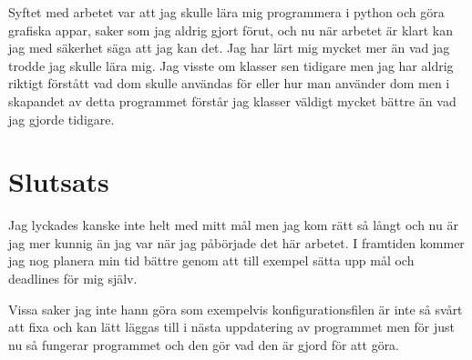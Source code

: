 \documentclass[a4paper, 12pt]{article}
\begin{document}
Syftet med arbetet var att jag skulle lära mig programmera i python och göra grafiska appar, saker som jag aldrig gjort förut, och nu när arbetet är klart kan jag med säkerhet säga att jag kan det. Jag har lärt mig mycket mer än vad jag trodde jag skulle lära mig. Jag visste om klasser sen tidigare men jag har aldrig riktigt förstått vad dom skulle användas för eller hur man använder dom men i skapandet av detta programmet förstår jag klasser väldigt mycket bättre än vad jag gjorde tidigare.


\section{Slutsats}

Jag lyckades kanske inte helt med mitt mål men jag kom rätt så långt och nu är jag mer kunnig än jag var när jag påbörjade det här arbetet.
I framtiden kommer jag nog planera min tid bättre genom att till exempel sätta upp mål och deadlines för mig själv.

Vissa saker jag inte hann göra som exempelvis konfigurationsfilen är inte så svårt att fixa och kan lätt läggas till i nästa uppdatering av programmet men för just nu så fungerar programmet och den gör vad den är gjord för att göra.  


\newpage 

%

\printbibliography
\end{document}
